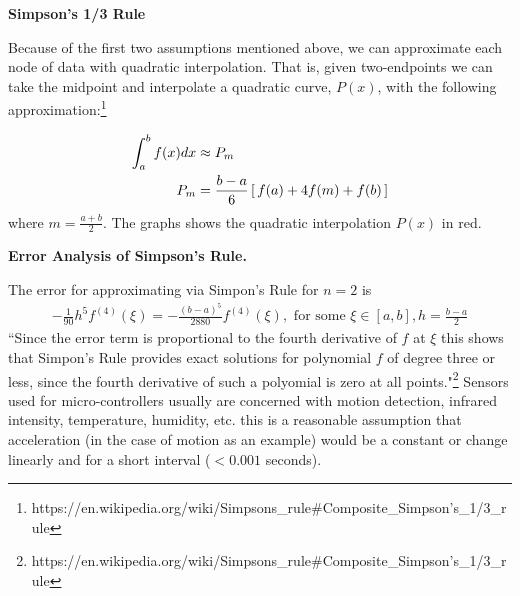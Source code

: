 \documentclass[12pt,a4paper]{report}
\begin{document}
\newcommand{\SECTION}[1]{\noindent\textbf{\Large{#1}}}
\newcommand{\SUBSECTION}[1]{\noindent\textbf{#1}}\SECTION{Simpson's 1/3 Rule\\}

Because of the first two assumptions mentioned above, we can approximate each node of data with quadratic interpolation.  That is, given two-endpoints we can take the midpoint and interpolate a quadratic curve, $P(x)$, with the following approximation:\footnote{https://en.wikipedia.org/wiki/Simpsons\_rule\#Composite\_Simpson's\_1/3\_rule}\\
\begin{minipage}{0.5\textwidth}
\begin{align*}
	\int_a^b f(x)dx &\approx P_m\\
	P_m &= \frac{b-a}{6}\left [\, f(a)+4f(m)+f(b) \,\right ]
\end{align*}where $m=\frac{a+b}{2}$.  The graphs shows the quadratic interpolation $P(x)$ in red.
\end{minipage}
\begin{minipage}{0.5\textwidth}
\begin{center}

\end{center}
\end{minipage}

\SUBSECTION{Error Analysis of Simpson's Rule.\\}

The error for approximating via Simpon's Rule for $n=2$ is 
\begin{align*}
	-\frac{1}{90}h^5f^{(4)}(\xi) = -\frac{(b-a)^5}{2880}f^{(4)}(\xi), \text{ for some } \xi \in [a,b], h=\frac{b-a}{2}
\end{align*}``Since the error term is proportional to the fourth derivative of $f$ at $\xi$ this shows that Simpon's Rule provides exact solutions for polynomial $f$ of degree three or less, since the fourth derivative of such a polyomial is zero at all points."\footnote{https://en.wikipedia.org/wiki/Simpsons\_rule\#Composite\_Simpson's\_1/3\_rule}  Sensors used for micro-controllers usually are concerned with motion detection, infrared intensity, temperature, humidity, etc. this is a reasonable assumption that acceleration (in the case of motion as an example) would be a constant or change linearly and for a short interval ($<0.001$ seconds).\\
\end{document}
